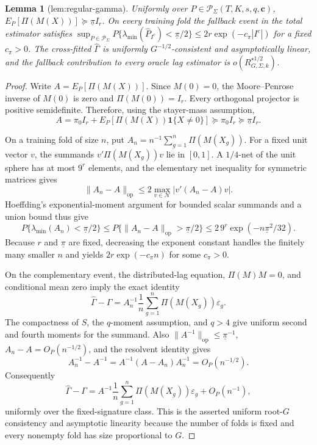 \documentclass{article}
\newtheorem{lemma}{Lemma}
\begin{document}
\begin{lemma}[lem:regular-gamma]\label{lem:regular-gamma}
Uniformly over \(P\in\mathcal P_\Sigma(T,K,s,q,\mathbf c)\), \(E_P[\Pi(M(X))]\succeq\underline\pi I_r\). On every training fold the fallback event in the total estimator satisfies \(\sup_{P\in\mathcal P_\Sigma}P\{\lambda_{\min}(\widehat P_{I^c})<\underline\pi/2\}\le 2r\exp(-c_\pi|I^c|)\) for a fixed \(c_\pi>0\). The cross-fitted \(\widehat\Gamma\) is uniformly \(G^{-1/2}\)-consistent and asymptotically linear, and the fallback contribution to every oracle lag estimator is \(o(R_{G,\Sigma,k}^{\star 1/2})\).
\end{lemma}
\begin{proof}
Write \(A=E_P[\Pi(M(X))]\). Since \(M(0)=0\), the Moore--Penrose inverse of \(M(0)\) is zero and \(\Pi(M(0))=I_r\). Every orthogonal projector is positive semidefinite. Therefore, using the stayer-mass assumption,
\[
A=\pi_0 I_r+E_P[\Pi(M(X))\mathbf 1\{X\ne0\}]
\succeq \pi_0I_r\succeq\underline\pi I_r.
\]

On a training fold of size \(n\), put \(A_n=n^{-1}\sum_{g=1}^n\Pi(M(X_g))\). For a fixed unit vector \(v\), the summands \(v'\Pi(M(X_g))v\) lie in \([0,1]\). A \(1/4\)-net of the unit sphere has at most \(9^r\) elements, and the elementary net inequality for symmetric matrices gives
\[
\|A_n-A\|_{\mathrm{op}}
\le 2\max_{v\in\mathcal N}|v'(A_n-A)v|.
\]
Hoeffding's exponential-moment argument for bounded scalar summands and a union bound thus give
\[
P\{\lambda_{\min}(A_n)<\underline\pi/2\}
\le P\{\|A_n-A\|_{\mathrm{op}}>\underline\pi/2\}
\le 2\,9^r\exp(-n\underline\pi^2/32).
\]
Because \(r\) and \(\underline\pi\) are fixed, decreasing the exponent constant handles the finitely many smaller \(n\) and yields \(2r\exp(-c_\pi n)\) for some \(c_\pi>0\).

On the complementary event, the distributed-lag equation, \(\Pi(M)M=0\), and conditional mean zero imply the exact identity
\[
\widehat\Gamma-\Gamma
=A_n^{-1}\frac1n\sum_{g=1}^n\Pi(M(X_g))\varepsilon_g.
\]
The compactness of \(S\), the \(q\)-moment assumption, and \(q>4\) give uniform second and fourth moments for the summand. Also \(\|A^{-1}\|_{\mathrm{op}}\le\underline\pi^{-1}\), \(A_n-A=O_P(n^{-1/2})\), and the resolvent identity gives
\[
A_n^{-1}-A^{-1}=A^{-1}(A-A_n)A_n^{-1}=O_P(n^{-1/2}).
\]
Consequently
\[
\widehat\Gamma-\Gamma
=A^{-1}\frac1n\sum_{g=1}^n\Pi(M(X_g))\varepsilon_g+O_P(n^{-1}),
\]
uniformly over the fixed-signature class. This is the asserted uniform root-\(G\) consistency and asymptotic linearity because the number of folds is fixed and every nonempty fold has size proportional to \(G\).


\end{proof}
\end{document}
